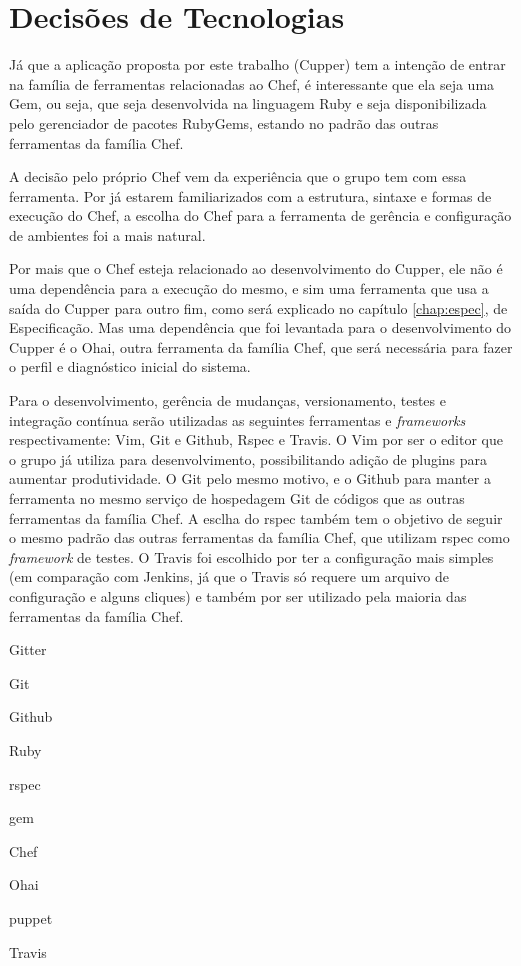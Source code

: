 \section{Decisões de Tecnologias}

Já que a aplicação proposta por este trabalho (Cupper) tem a intenção de entrar
na família de ferramentas relacionadas ao Chef, é interessante que ela seja uma
Gem, ou seja, que seja desenvolvida na linguagem Ruby e seja disponibilizada pelo
gerenciador de pacotes RubyGems, estando no padrão das outras ferramentas da
família Chef.

A decisão pelo próprio Chef vem da experiência que o grupo tem com essa ferramenta.
Por já estarem familiarizados com a estrutura, sintaxe e formas de execução do Chef,
a escolha do Chef para a ferramenta de gerência e configuração de ambientes foi a
mais natural.

Por mais que o Chef esteja relacionado ao desenvolvimento do Cupper, ele não é uma
dependência para a execução do mesmo, e sim uma ferramenta que usa a saída do Cupper
para outro fim, como será explicado no capítulo \ref{chap:espec}, de Especificação.
Mas uma dependência que foi levantada para o desenvolvimento do Cupper é o Ohai,
outra ferramenta da família Chef, que será necessária para fazer o perfil e diagnóstico
inicial do sistema.

Para o desenvolvimento, gerência de mudanças, versionamento, testes e integração
contínua serão utilizadas as seguintes ferramentas e \textit{frameworks} respectivamente:
Vim, Git e Github, Rspec e Travis. O Vim por ser o editor que o grupo já utiliza para
desenvolvimento, possibilitando adição de plugins para aumentar produtividade. O Git
pelo mesmo motivo, e o Github para manter a ferramenta no mesmo serviço de hospedagem
Git de códigos que as outras ferramentas da família Chef. A esclha do rspec também
tem o objetivo de seguir o mesmo padrão das outras ferramentas da família Chef, que
utilizam rspec como \textit{framework} de testes. O Travis foi escolhido por ter a
configuração mais simples (em comparação com Jenkins, já que o Travis só requere
um arquivo de configuração e alguns cliques) e também por ser utilizado pela
maioria das ferramentas da família Chef.




Gitter

Git

Github

Ruby

rspec

gem

Chef

Ohai

puppet

Travis


